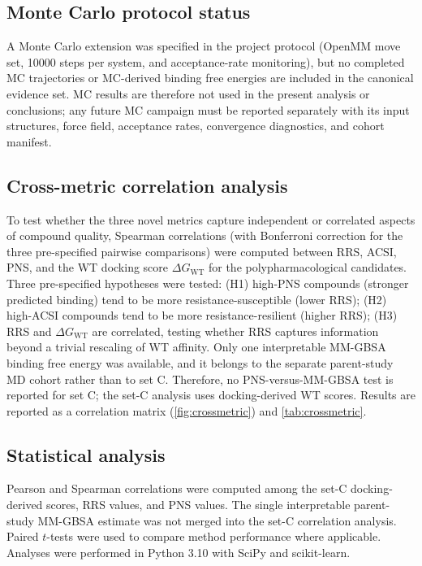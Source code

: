 \documentclass[11pt,a4paper]{article}
\begin{document}
\subsection{Monte Carlo protocol status}

A Monte Carlo extension was specified in the project protocol (OpenMM move set, \num{10000} steps per system, and acceptance-rate monitoring), but no completed MC trajectories or MC-derived binding free energies are included in the canonical evidence set. MC results are therefore not used in the present analysis or conclusions; any future MC campaign must be reported separately with its input structures, force field, acceptance rates, convergence diagnostics, and cohort manifest.

\subsection{Cross-metric correlation analysis}

To test whether the three novel metrics capture independent or correlated aspects of compound quality, Spearman correlations (with Bonferroni correction for the three pre-specified pairwise comparisons) were computed between RRS, ACSI, PNS, and the WT docking score $\Delta G_{\mathrm{WT}}$ for the polypharmacological candidates. Three pre-specified hypotheses were tested: (H1) high-PNS compounds (stronger predicted binding) tend to be more resistance-susceptible (lower RRS); (H2) high-ACSI compounds tend to be more resistance-resilient (higher RRS); (H3) RRS and $\Delta G_{\mathrm{WT}}$ are correlated, testing whether RRS captures information beyond a trivial rescaling of WT affinity. Only one interpretable MM-GBSA binding free energy was available, and it belongs to the separate parent-study MD cohort rather than to set C. Therefore, no PNS-versus-MM-GBSA test is reported for set C; the set-C analysis uses docking-derived WT scores. Results are reported as a correlation matrix (\cref{fig:crossmetric}) and \cref{tab:crossmetric}.

\subsection{Statistical analysis}

Pearson and Spearman correlations were computed among the set-C docking-derived scores, RRS values, and PNS values. The single interpretable parent-study MM-GBSA estimate was not merged into the set-C correlation analysis. Paired $t$-tests were used to compare method performance where applicable. Analyses were performed in Python 3.10 with SciPy and scikit-learn.
\end{document}
